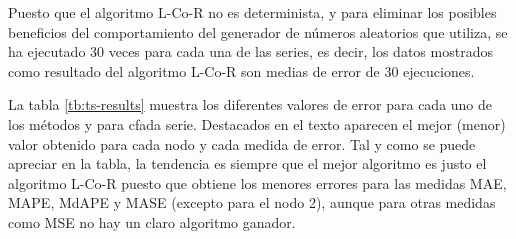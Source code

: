 \documentclass[runningheads]{llncs}
\begin{document}
Puesto que el algoritmo L-Co-R no es determinista, y para eliminar los posibles beneficios del
comportamiento del generador de números aleatorios que utiliza, se ha ejecutado 30 veces para cada
una de las series, es decir, los datos mostrados como resultado del algoritmo L-Co-R son medias de
error de 30 ejecuciones.

La tabla \ref{tb:ts-results} muestra los diferentes valores de error para cada uno de los métodos y
para cfada serie. Destacados en el texto aparecen el mejor (menor) valor obtenido para cada nodo y
cada medida de error. Tal y como se puede apreciar en la tabla, la tendencia es siempre que el
mejor algoritmo es justo el algoritmo L-Co-R puesto que obtiene los menores errores para las
medidas MAE, MAPE, MdAPE y MASE (excepto para el nodo 2), aunque para otras medidas como MSE no hay
un claro algoritmo ganador. 
\end{document}
